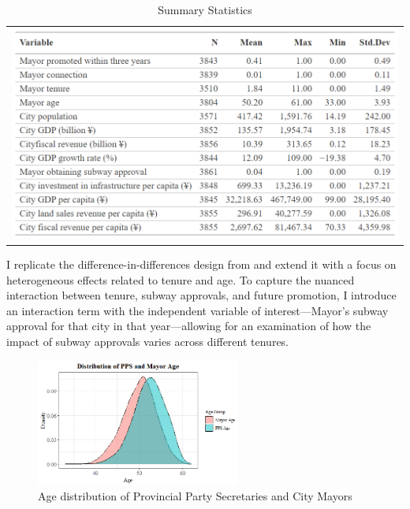\documentclass[12pt, ]{article}
\begin{document}
\hypertarget{tbl-statsumm}{}
\begin{longtable}[]{@{}l@{}}
\caption{\label{tbl-statsumm}Summary Statistics}\tabularnewline
\toprule\noalign{}
\endfirsthead
\endhead
\bottomrule\noalign{}
\endlastfoot
\includegraphics{tables/final_summ_stat.png} \\
\end{longtable}

I replicate the difference-in-differences design from
\citet{lei2022private} and extend it with a focus on heterogeneous
effects related to tenure and age. To capture the nuanced interaction
between tenure, subway approvals, and future promotion, I introduce an
interaction term with the independent variable of interest---Mayor's
subway approval for that city in that year---allowing for an examination
of how the impact of subway approvals varies across different tenures.

\begin{figure}[tbp]

{\centering \includegraphics[width=0.6\textwidth,height=\textheight]{figures/age_distribution2.png}

}

\caption{\label{fig-agedist}Age distribution of Provincial Party
Secretaries and City Mayors}

\end{figure}
\end{document}
